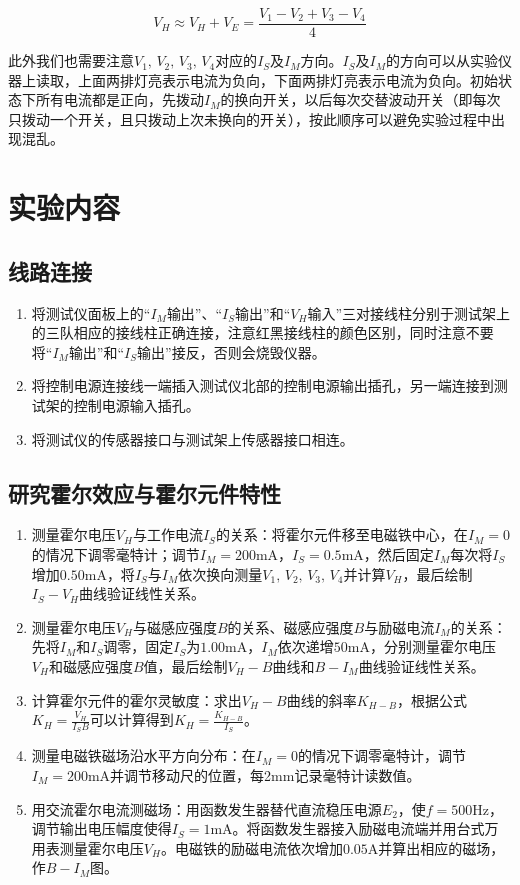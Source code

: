 \documentclass[12pt]{article}
\begin{document}
\[
    V_H \approx V_H+V_E=\frac{V_1-V_2+V_3-V_4}{4}
\]

此外我们也需要注意$V_1,\,V_2,\,V_3,\,V_4$对应的$I_S$及$I_M$方向。$I_S$及$I_M$的方向可以从实验仪器上读取，上面两排灯亮表示电流为负向，下面两排灯亮表示电流为负向。初始状态下所有电流都是正向，先拨动$I_M$的换向开关，以后每次交替波动开关（即每次只拨动一个开关，且只拨动上次未换向的开关），按此顺序可以避免实验过程中出现混乱。

\section{实验内容}
\subsection{线路连接}
\begin{enumerate}
    \item 将测试仪面板上的“$I_M$输出”、“$I_S$输出”和“$V_H$输入”三对接线柱分别于测试架上的三队相应的接线柱正确连接，注意红黑接线柱的颜色区别，同时注意不要将“$I_M$输出”和“$I_S$输出”接反，否则会烧毁仪器。
    \item 将控制电源连接线一端插入测试仪北部的控制电源输出插孔，另一端连接到测试架的控制电源输入插孔。
    \item 将测试仪的传感器接口与测试架上传感器接口相连。
\end{enumerate}

\subsection{研究霍尔效应与霍尔元件特性}
\begin{enumerate}
    \item 测量霍尔电压$V_H$与工作电流$I_S$的关系：将霍尔元件移至电磁铁中心，在$I_M=0$的情况下调零毫特计；调节$I_M=200\mathrm{mA}$，$I_S=0.5\mathrm{mA}$，然后固定$I_M$每次将$I_S$增加$0.50\mathrm{mA}$，将$I_S$与$I_M$依次换向测量$V_1,\,V_2,\,V_3,\,V_4$并计算$V_H$，最后绘制$I_S-V_H$曲线验证线性关系。
    \item 测量霍尔电压$V_H$与磁感应强度$B$的关系、磁感应强度$B$与励磁电流$I_M$的关系：先将$I_M$和$I_S$调零，固定$I_S$为$1.00\mathrm{mA}$，$I_M$依次递增$50\mathrm{mA}$，分别测量霍尔电压$V_H$和磁感应强度$B$值，最后绘制$V_H-B$曲线和$B-I_M$曲线验证线性关系。
    \item 计算霍尔元件的霍尔灵敏度：求出$V_H-B$曲线的斜率$K_{H-B}$，根据公式$K_H=\frac{V_H}{I_SB}$可以计算得到$K_H=\frac{K_{H-B}}{I_S}$。
    \item 测量电磁铁磁场沿水平方向分布：在$I_M=0$的情况下调零毫特计，调节$I_M=200\mathrm{mA}$并调节移动尺的位置，每2mm记录毫特计读数值。
    \item 用交流霍尔电流测磁场：用函数发生器替代直流稳压电源$E_2$，使$f=500\mathrm{Hz}$，调节输出电压幅度使得$I_S=1\mathrm{mA}$。将函数发生器接入励磁电流端并用台式万用表测量霍尔电压$V_H$。电磁铁的励磁电流依次增加$0.05\mathrm{A}$并算出相应的磁场，作$B-I_M$图。
\end{enumerate}
\end{document}
